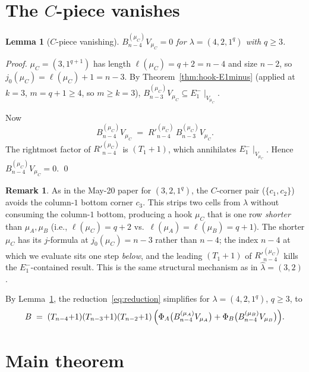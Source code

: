 \documentclass[11pt]{article}
\newtheorem{lemma}[theorem]{Lemma}
\theoremstyle{definition}
\newtheorem{remark}[theorem]{Remark}
\newcommand{\hatl}{\widehat\lambda}
\newcommand{\Rp}{{R'}}
\begin{document}
\section{The $C$-piece vanishes}\label{sec:C-zero}

\begin{lemma}[$C$-piece vanishing]\label{lem:C-zero}
$B_{n-4}^{(\mu_C)} V_{\mu_C} = 0$ for $\lambda = (4, 2, 1^q)$ with
$q \ge 3$.
\end{lemma}

\begin{proof}
$\mu_C = (3, 1^{q+1})$ has length $\ell(\mu_C) = q + 2 = n - 4$ and
size $n - 2$, so $j_0(\mu_C) = \ell(\mu_C) + 1 = n - 3$.  By
Theorem~\ref{thm:hook-E1minus} (applied at $k = 3$, $m = q + 1 \ge
4$, so $m \ge k = 3$),
$B^{(\mu_C)}_{n-3} V_{\mu_C} \subseteq E_1^-\!\mid_{V_{\mu_C}}$.

Now
\[
   B^{(\mu_C)}_{n-4} V_{\mu_C}
   \;=\; \Rp^{(\mu_C)}_{n-4}\,B^{(\mu_C)}_{n-3} V_{\mu_C}.
\]
The rightmost factor of $\Rp^{(\mu_C)}_{n-4}$ is $(T_1{+}1)$, which
annihilates $E_1^-\!\mid_{V_{\mu_C}}$.  Hence
$B^{(\mu_C)}_{n-4} V_{\mu_C} = 0$.
\qed
\end{proof}

\begin{remark}\label{rem:C-mechanism}
As in the May-20 paper for $(3, 2, 1^q)$, the $C$-corner pair
($\{c_1, c_2\}$) avoids the column-$1$ bottom corner $c_3$.  This
strips two cells from $\lambda$ without consuming the column-$1$
bottom, producing a hook $\mu_C$ that is one row \emph{shorter}
than $\mu_A, \mu_B$ (i.e., $\ell(\mu_C) = q + 2$ vs.\
$\ell(\mu_A) = \ell(\mu_B) = q + 1$).  The shorter $\mu_C$ has its
$j$-formula at $j_0(\mu_C) = n - 3$ rather than $n - 4$; the index
$n - 4$ at which we evaluate sits one step \emph{below}, and the
leading $(T_1{+}1)$ of $\Rp^{(\mu_C)}_{n-4}$ kills the
$E_1^-$-contained result.  This is the same structural mechanism
as in $\hatl = (3, 2)$.
\end{remark}

By Lemma~\ref{lem:C-zero}, the reduction~\eqref{eq:reduction}
simplifies for $\lambda = (4, 2, 1^q)$, $q \ge 3$, to
\begin{equation}\label{eq:reduction-AB}
   B \;=\; (T_{n-4}{+}1)(T_{n-3}{+}1)(T_{n-2}{+}1)\,
   \Bigl(\Phi_A\bigl(B_{n-4}^{(\mu_A)} V_{\mu_A}\bigr)
   + \Phi_B\bigl(B_{n-4}^{(\mu_B)} V_{\mu_B}\bigr)\Bigr).
\end{equation}

\section{Main theorem}\label{sec:main}
\end{document}
